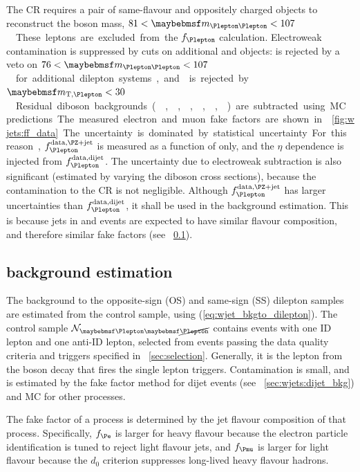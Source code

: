 The \Zjets CR requires a pair of same-flavour and oppositely charged \id{\Plepton} objects 
to reconstruct the \PZ boson mass, \unit{$81 < \mll < 107$}{\GeV}. These leptons are 
excluded from the $f_{\Plepton}$ calculation. Electroweak contamination is suppressed by 
cuts on additional \id{\Plepton} and \antiid{\Plepton} objects: \ZZ is rejected by a veto 
on \unit{$76 < \mll < 107$}{\GeV} for additional dilepton systems, and \WZ is rejected by 
\unit{$\mtw < 30$}{\GeV}. Residual diboson backgrounds (\Zgamma, \ZZ, \Zgstar, \Wgamma, \WZ, 
\Wgstar) are subtracted using MC predictions.

The measured electron and muon fake factors are shown in \Figure~\ref{fig:wjets:ff_data}. 
The uncertainty is dominated by statistical uncertainty. For this reason, 
$f_{\Plepton}^{\text{data,\Zjets}}$ is measured as a function of \pt only, and the $\eta$ 
dependence is injected from $f_{\Plepton}^{\text{data,dijet}}$. The uncertainty due to 
electroweak subtraction is also significant (estimated by varying the diboson cross 
sections), because the contamination to the \Zjets CR is not negligible. Although 
$f_{\Plepton}^{\text{data,\Zjets}}$ has larger uncertainties than 
$f_{\Plepton}^{\text{data,dijet}}$, it shall be used in the \Wjets background estimation. 
This is because jets in \Zjets and \Wjets events are expected to have similar flavour 
composition, and therefore similar fake factors (see \Section~\ref{sec:wjets:wjet_bkg}).



\subsection{\Wjets background estimation}
\label{sec:wjets:wjet_bkg}

The \Wjets background to the opposite-sign (OS) and same-sign (SS) dilepton samples are 
estimated from the \Wjets control sample, using (\ref{eq:wjet_bkgto_dilepton}). The 
\Wjets control sample $\mathcal{N}_{\id{\Plepton}\antiid{\Plepton}}$ contains events with 
one ID lepton and one anti-ID lepton, selected from events passing the data quality 
criteria and triggers specified in \Section~\ref{sec:selection}. Generally, it is the 
lepton from the \PW boson decay that fires the single lepton triggers. Contamination is 
small, and is estimated by the fake factor method for dijet events (see 
\Section~\ref{sec:wjets:dijet_bkg}) and MC for other processes.

The fake factor of a process is determined by the jet flavour composition of that 
process. Specifically, $f_{\Pe}$ is larger for heavy flavour because the electron 
particle identification is tuned to reject light flavour jets, and $f_{\Pmu}$ is larger 
for light flavour because the $d_0$ criterion suppresses long-lived heavy flavour hadrons.

